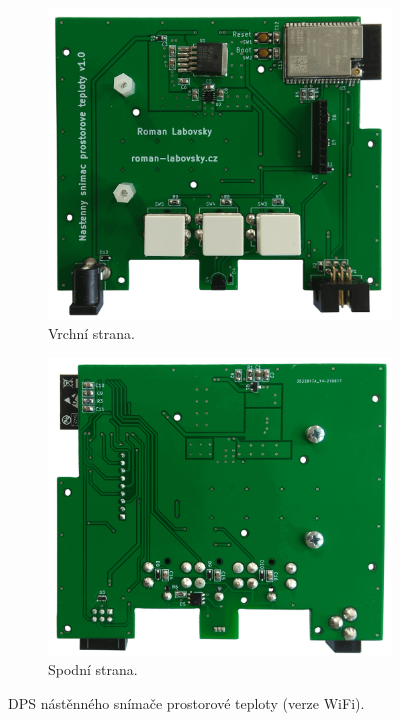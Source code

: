 \begin{figure}[H]
\centering
\begin{subfigure}{.5\textwidth}
  \centering
    \includegraphics[width=\textwidth]{images/nastenny-snimac-prostorove-teploty-wifi/dps-nastenny-snimac-prostorove-teploty-wifi-vrchni-cast.png}
    \caption{Vrchní strana.}
    \label{fig:dps-nastenny-snimac-prostorove-teploty-wifi-vrchni-cast}
\end{subfigure}%
\begin{subfigure}{.5\textwidth}
  \centering
    \includegraphics[width=\textwidth]{images/nastenny-snimac-prostorove-teploty-wifi/dps-nastenny-snimac-prostorove-teploty-wifi-spodni-cast.png}
    \caption{Spodní strana.}
    \label{fig:dps-nastenny-snimac-prostorove-teploty-wifi-spodni-cast}
\end{subfigure}
\caption{DPS nástěnného snímače prostorové teploty (verze WiFi).}
\label{fig:dps-nastenny-snimac-prostorove-teploty-wifi}
\end{figure}


